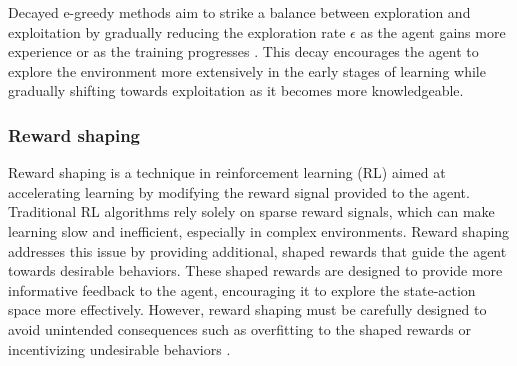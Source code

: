 Decayed e-greedy methods aim to strike a balance between exploration and exploitation by gradually reducing the exploration rate $\epsilon$ as the agent gains more experience or as the training progresses \cite{sutton2018reinforcement}. This decay encourages the agent to explore the environment more extensively in the early stages of learning while gradually shifting towards exploitation as it becomes more knowledgeable.

\subsubsection{Reward shaping}

Reward shaping is a technique in reinforcement learning (RL) aimed at accelerating learning by modifying the reward signal provided to the agent. Traditional RL algorithms rely solely on sparse reward signals, which can make learning slow and inefficient, especially in complex environments. Reward shaping addresses this issue by providing additional, shaped rewards that guide the agent towards desirable behaviors. These shaped rewards are designed to provide more informative feedback to the agent, encouraging it to explore the state-action space more effectively. However, reward shaping must be carefully designed to avoid unintended consequences such as overfitting to the shaped rewards or incentivizing undesirable behaviors \cite{russel2020ai}.




